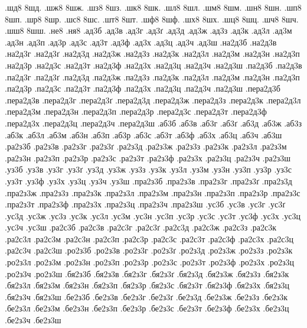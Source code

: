 {.шд8
8шд.
.шж8
8шж.
.шз8
8шз.
.шк8
8шк.
.шл8
8шл.
.шм8
8шм.
.шн8
8шн.
.шп8
8шп.
.шр8
8шр.
.шс8
8шс.
.шт8
8шт.
.шф8
8шф.
.шх8
8шх.
.шц8
8шц.
.шч8
8шч.
.шш8
8шш.
.не8
.ня8
.ад3б
.ад3в
.ад3г
.ад3ґ
.ад3д
.ад3ж
.ад3з
.ад3к
.ад3л
.ад3м
.ад3н
.ад3п
.ад3р
.ад3с
.ад3т
.ад3ф
.ад3х
.ад3ц
.ад3ч
.ад3ш
.на2д3б
.на2д3в
.на2д3г
.на2д3ґ
.на2д3д
.на2д3ж
.на2д3з
.на2д3к
.на2д3л
.на2д3м
.на2д3н
.на2д3п
.на2д3р
.на2д3с
.на2д3т
.на2д3ф
.на2д3х
.на2д3ц
.на2д3ч
.на2д3ш
.па2д3б
.па2д3в
.па2д3г
.па2д3ґ
.па2д3д
.па2д3ж
.па2д3з
.па2д3к
.па2д3л
.па2д3м
.па2д3н
.па2д3п
.па2д3р
.па2д3с
.па2д3т
.па2д3ф
.па2д3х
.па2д3ц
.па2д3ч
.па2д3ш
.пера2д3б
.пера2д3в
.пера2д3г
.пера2д3ґ
.пера2д3д
.пера2д3ж
.пера2д3з
.пера2д3к
.пера2д3л
.пера2д3м
.пера2д3н
.пера2д3п
.пера2д3р
.пера2д3с
.пера2д3т
.пера2д3ф
.пера2д3х
.пера2д3ц
.пера2д3ч
.пера2д3ш
.аб3б
.аб3в
.аб3г
.аб3ґ
.аб3д
.аб3ж
.аб3з
.аб3к
.аб3л
.аб3м
.аб3н
.аб3п
.аб3р
.аб3с
.аб3т
.аб3ф
.аб3х
.аб3ц
.аб3ч
.аб3ш
.ра2з3б
.ра2з3в
.ра2з3г
.ра2з3ґ
.ра2з3д
.ра2з3ж
.ра2з3з
.ра2з3к
.ра2з3л
.ра2з3м
.ра2з3н
.ра2з3п
.ра2з3р
.ра2з3с
.ра2з3т
.ра2з3ф
.ра2з3х
.ра2з3ц
.ра2з3ч
.ра2з3ш
.уз3б
.уз3в
.уз3г
.уз3ґ
.уз3д
.уз3ж
.уз3з
.уз3к
.уз3л
.уз3м
.уз3н
.уз3п
.уз3р
.уз3с
.уз3т
.уз3ф
.уз3х
.уз3ц
.уз3ч
.уз3ш
.пра2з3б
.пра2з3в
.пра2з3г
.пра2з3ґ
.пра2з3д
.пра2з3ж
.пра2з3з
.пра2з3к
.пра2з3л
.пра2з3м
.пра2з3н
.пра2з3п
.пра2з3р
.пра2з3с
.пра2з3т
.пра2з3ф
.пра2з3х
.пра2з3ц
.пра2з3ч
.пра2з3ш
.ус3б
.ус3в
.ус3г
.ус3ґ
.ус3д
.ус3ж
.ус3з
.ус3к
.ус3л
.ус3м
.ус3н
.ус3п
.ус3р
.ус3с
.ус3т
.ус3ф
.ус3х
.ус3ц
.ус3ч
.ус3ш
.ра2с3б
.ра2с3в
.ра2с3г
.ра2с3ґ
.ра2с3д
.ра2с3ж
.ра2с3з
.ра2с3к
.ра2с3л
.ра2с3м
.ра2с3н
.ра2с3п
.ра2с3р
.ра2с3с
.ра2с3т
.ра2с3ф
.ра2с3х
.ра2с3ц
.ра2с3ч
.ра2с3ш
.ро2з3б
.ро2з3в
.ро2з3г
.ро2з3ґ
.ро2з3д
.ро2з3ж
.ро2з3з
.ро2з3к
.ро2з3л
.ро2з3м
.ро2з3н
.ро2з3п
.ро2з3р
.ро2з3с
.ро2з3т
.ро2з3ф
.ро2з3х
.ро2з3ц
.ро2з3ч
.ро2з3ш
.бя2з3б
.бя2з3в
.бя2з3г
.бя2з3ґ
.бя2з3д
.бя2з3ж
.бя2з3з
.бя2з3к
.бя2з3л
.бя2з3м
.бя2з3н
.бя2з3п
.бя2з3р
.бя2з3с
.бя2з3т
.бя2з3ф
.бя2з3х
.бя2з3ц
.бя2з3ч
.бя2з3ш
.бе2з3б
.бе2з3в
.бе2з3г
.бе2з3ґ
.бе2з3д
.бе2з3ж
.бе2з3з
.бе2з3к
.бе2з3л
.бе2з3м
.бе2з3н
.бе2з3п
.бе2з3р
.бе2з3с
.бе2з3т
.бе2з3ф
.бе2з3х
.бе2з3ц
.бе2з3ч
.бе2з3ш
}
